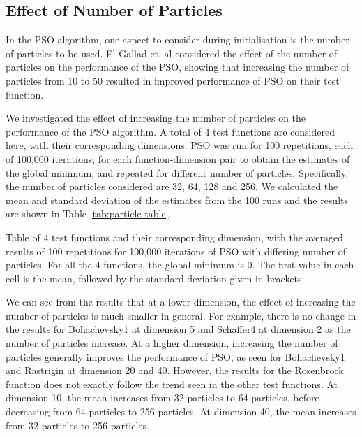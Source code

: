 \documentclass[12pt]{article}
\theoremstyle{definition}
\begin{document}
\subsection{Effect of Number of Particles}
\label{subsection:number of particles}
In the PSO algorithm, one aspect to consider during initialisation is the number of particles to be used. El-Gallad et. al \cite{El-Gallad2002} considered the effect of the number of particles on the performance of the PSO, showing that increasing the number of particles from 10 to 50 resulted in improved performance of PSO on their test function. \newline

We investigated the effect of increasing the number of particles on the performance of the PSO algorithm. A total of 4 test functions are considered here, with their corresponding dimensions. PSO was run for 100 repetitions, each of 100,000 iterations, for each function-dimension pair to obtain the estimates of the global minimum, and repeated for different number of particles. Specifically, the number of particles considered are 32, 64, 128 and 256. We calculated the mean and standard deviation of the estimates from the 100 runs and the results are shown in Table \ref{tab:particle table}.

\begin{table}[H]
    \centering
    \resizebox{\textwidth}{!}{
        
    }
    \caption{Table of 4 test functions and their corresponding dimension, with the averaged results of 100 repetitions for 100,000 iterations of PSO with differing number of particles. For all the 4 functions, the global minimum is 0. The first value in each cell is the mean, followed by the standard deviation given in brackets.}
    \label{tab:particle table}
\end{table}

We can see from the results that at a lower dimension, the effect of increasing the number of particles is much smaller in general. For example, there is no change in the results for Bohachevsky1 at dimension 5 and Schaffer4 at dimension 2 as the number of particles increase. At a higher dimension, increasing the number of particles generally improves the performance of PSO, as seen for Bohachevsky1 and Rastrigin at dimension 20 and 40. However, the results for the Rosenbrock function does not exactly follow the trend seen in the other test functions. At dimension 10, the mean increases from 32 particles to 64 particles, before decreasing from 64 particles to 256 particles. At dimension 40, the mean increases from 32 particles to 256 particles. \newline
\end{document}
